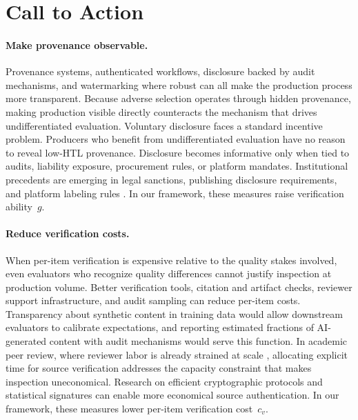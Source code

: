 \documentclass{article}
\theoremstyle{plain}
\theoremstyle{definition}
\theoremstyle{remark}
\begin{document}
\section{Call to Action}
\label{sec:call-to-action}

\paragraph{Make provenance observable.}
Provenance systems, authenticated workflows, disclosure backed by audit mechanisms, and watermarking where robust can all make the production process more transparent. Because adverse selection operates through hidden provenance, making production visible directly counteracts the mechanism that drives undifferentiated evaluation. Voluntary disclosure faces a standard incentive problem. Producers who benefit from undifferentiated evaluation have no reason to reveal low-HTL provenance. Disclosure becomes informative only when tied to audits, liability exposure, procurement rules, or platform mandates. Institutional precedents are emerging in legal sanctions, publishing disclosure requirements, and platform labeling rules \citep{mata2023sanctions, eu2025codepractice, gewaltig-2025-ai}. In our framework, these measures raise verification ability~$g$.

\paragraph{Reduce verification costs.}
When per-item verification is expensive relative to the quality stakes involved, even evaluators who recognize quality differences cannot justify inspection at production volume. Better verification tools, citation and artifact checks, reviewer support infrastructure, and audit sampling can reduce per-item costs. Transparency about synthetic content in training data would allow downstream evaluators to calibrate expectations, and reporting estimated fractions of AI-generated content with audit mechanisms would serve this function. In academic peer review, where reviewer labor is already strained at scale \citep{aczel2021estimating}, allocating explicit time for source verification addresses the capacity constraint that makes inspection uneconomical. Research on efficient cryptographic protocols and statistical signatures can enable more economical source authentication. In our framework, these measures lower per-item verification cost~$c_v$.
\end{document}
